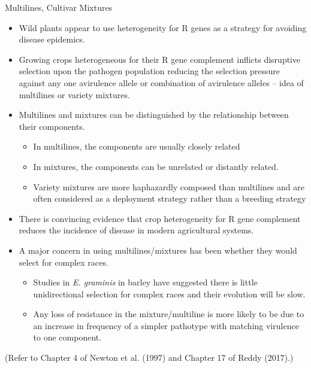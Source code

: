 \documentclass[11pt,dvipsnames,ignorenonframetext,aspectratio=169]{beamer}
\providecommand{\tightlist}{%
  \setlength{\itemsep}{0pt}\setlength{\parskip}{0pt}}
\begin{document}
\begin{frame}{Multilines, Cultivar Mixtures}
\begin{itemize}
\tightlist
\item
  Wild plants appear to use heterogeneity for R genes as a strategy for
  avoiding disease epidemics.
\item
  Growing crops heterogeneous for their R gene complement inflicts
  disruptive selection upon the pathogen population reducing the
  selection pressure against any one avirulence allele or combination of
  avirulence alleles -- idea of multilines or variety mixtures.
\item
  Multilines and mixtures can be distinguished by the relationship
  between their components.

  \begin{itemize}
  \tightlist
  \item
    In multilines, the components are usually closely related
  \item
    In mixtures, the components can be unrelated or distantly related.
  \item
    Variety mixtures are more haphazardly composed than multilines and
    are often considered as a deployment strategy rather than a breeding
    strategy
  \end{itemize}
\end{itemize}
\end{frame}

\begin{frame}{}
\protect\hypertarget{section-8}{}
\begin{itemize}
\tightlist
\item
  There is convincing evidence that crop heterogeneity for R gene
  complement reduces the incidence of disease in modern agricultural
  systems.
\item
  A major concern in using multilines/mixtures has been whether they
  would select for complex races.

  \begin{itemize}
  \tightlist
  \item
    Studies in \textit{E. graminis} in barley have suggested there is
    little unidirectional selection for complex races and their
    evolution will be slow.
  \item
    Any loss of resistance in the mixture/multiline is more likely to be
    due to an increase in frequency of a simpler pathotype with matching
    virulence to one component.
  \end{itemize}
\end{itemize}

(Refer to Chapter 4 of Newton et al. (1997) and Chapter 17 of Reddy
(2017).)
\end{frame}
\end{document}
